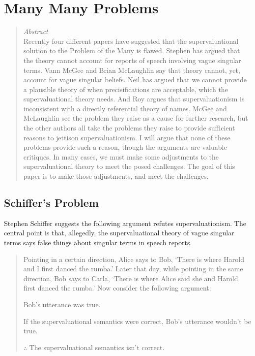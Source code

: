 
%
%
%
%
%
%
%
%
%
%
\chapter{Many Many Problems}


\begin{quote}
\textit{Abstract} \\
Recently four different papers have suggested that the supervaluational solution to the Problem of the Many is flawed. Stephen \citet{Schiffer1998, Schiffer2000b, Schiffer2000a} has argued that the theory cannot account for reports of speech involving vague singular terms. Vann McGee and Brian McLaughlin \citeyearpar{McGee2000} say that theory cannot, yet, account for vague singular beliefs. Neil \citet{McKinnon2002} has argued that we cannot provide a plausible theory of when precisifications are acceptable, which the supervaluational theory needs. And Roy \citet{Sorensen2000} argues that supervaluationism is inconsistent with a directly referential theory of names. McGee and McLaughlin see the problem they raise as a cause for further research, but the other authors all take the problems they raise to provide sufficient reasons to jettison supervaluationism. I will argue that none of these problems provide such a reason, though the arguments are valuable critiques. In many cases, we must make some adjustments to the supervaluational theory to meet the posed challenges. The goal of this paper is to make those adjustments, and meet the challenges.
\end{quote}

\section{Schiffer's Problem}

Stephen Schiffer suggests the following argument refutes supervaluationism. The central point is that, allegedly, the supervaluational theory of vague singular terms says false things about singular terms in speech reports.

\begin{quote}
Pointing in a certain direction, Alice says to Bob, `There is where Harold and I first danced the rumba.' Later that day, while pointing in the same direction, Bob says to Carla, `There is where Alice said she and Harold first danced the rumba.' Now consider the following argument:

\begin{enumerate}
\begin{sloppy}
\renewcommand{\labelenumi}{(\arabic{enumi})}
\item Bob's utterance was true.
\item If the supervaluational semantics were correct, Bob's utterance wouldn't be true.
\item $\therefore$ The supervaluational semantics isn't correct. \cite[321]{Schiffer2000b}
\end{sloppy}
\end{enumerate}
\end{quote}

